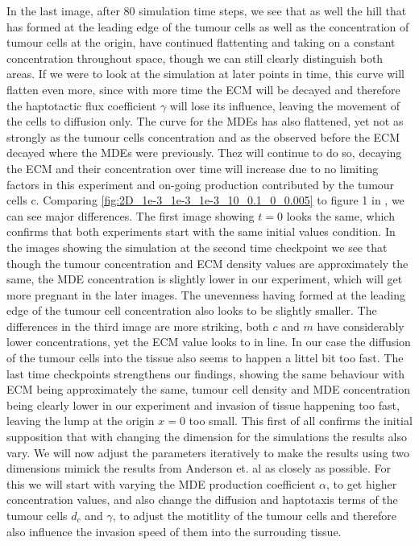 In the last image, after 80 simulation time steps, we see that as well the hill that has formed at the leading edge of the tumour cells as well as the concentration of tumour cells at the origin, have continued flattenting and taking on a constant concentration throughout space, though we can still clearly distinguish both areas. If we were to look at the simulation at later points in time, this curve will flatten even more, since with more time the ECM will be decayed and therefore the haptotactic flux coefficient $\gamma$ will lose its influence, leaving the movement of the cells to diffusion only. The curve for the MDEs has also flattened, yet not as strongly as the tumour cells concentration and as the observed before the ECM decayed where the MDEs were previously. Thez will continue to do so, decaying the ECM and their concentration over time will increase due to no limiting factors in this experiment and on-going production contributed by the tumour cells c.\newline
Comparing \ref{fig:2D_1e-3_1e-3_1e-3_10_0.1_0_0.005} to figure 1 in \cite{anderson_mathematical_2000}, we can see major differences. The first image showing $t=0$ looks the same, which confirms that both experiments start with the same initial values condition. In the images showing the simulation at the second time checkpoint we see that though the tumour concentration and ECM density values are approximately the same, the MDE concentration is slightly lower in our experiment, which will get more pregnant in the later images. The unevenness having formed at the leading edge of the tumour cell concentration also looks to be slightly smaller. The differences in the third image are more striking, both $c$ and $m$ have considerably lower concentrations, yet the ECM value looks to in line. In our case the diffusion of the tumour cells into the tissue also seems to happen a littel bit too fast. The last time checkpoints strengthens our findings, showing the same behaviour with ECM being approximately the same, tumour cell density and MDE concentration being clearly lower in our experiment and invasion of tissue happening too fast, leaving the lump at the origin $x=0$ too small. \newline 
This first of all confirms the initial supposition that with changing the dimension for the simulations the results also vary. We will now adjust the parameters iteratively to make the results using two dimensions mimick the results from Anderson et. al as closely as possible. For this we will start with varying the MDE production coefficient $\alpha$, to get higher concentration values, and also change the diffusion and haptotaxis terms of the tumour cells $d_c$ and  $\gamma$, to adjust the motitlity of the tumour cells and therefore also influence the invasion speed of them into the surrouding tissue.
